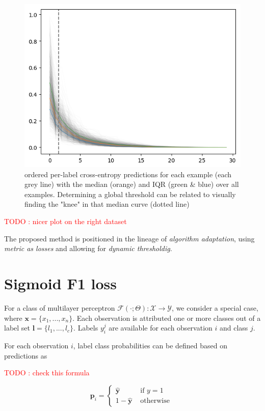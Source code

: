 \documentclass[sigconf,natbib,screen=true,review=true,anonymous]{acmart}
\newcommand\todo[1]{\textcolor{red}{TODO : #1}}
\begin{document}
\begin{figure}[htbp]
\centering
\includegraphics[width=.9\linewidth]{./images/knee.png}
\caption{\label{fig:knee}
ordered per-label cross-entropy predictions for each example (each grey line) with the median (orange) and IQR (green \& blue) over all examples. Determining a global threshold can be related to visually finding the "knee" in that median curve (dotted line)}
\end{figure}

\todo{nicer plot on the right dataset}

The proposed method is positioned in the lineage of \emph{algorithm adaptation}, using \emph{metric as losses} and allowing for \emph{dynamic thresholdig}. 

\section{Sigmoid F1 loss}
\label{sec:org1d3ce39}

For a class of multilayer perceptron \(\mathcal{F}(\cdot ; \Theta): \mathcal{X} \rightarrow \mathcal{Y}\), we consider a special case, where \(\mathbf{x} = \{x_1, ..., x_n\}\). Each observation is attributed one or more classes out of a label set \(\mathbf{l} = \{l_1, ..., l_c\}\). Labels \(y_{i}^{j}\) are available for each observation \(i\) and class \(j\). 

For each observation \(i\), label class probabilities can be defined based on predictions as

\todo{check this formula}

\begin{equation}
\mathbf{p}_{i}=\left\{\begin{array}{ll}\hat{\mathbf{y}} & \text { if } y=1 \\ 1-\hat{\mathbf{y}} & \text { otherwise }\end{array}\right.
\end{equation}
\end{document}
